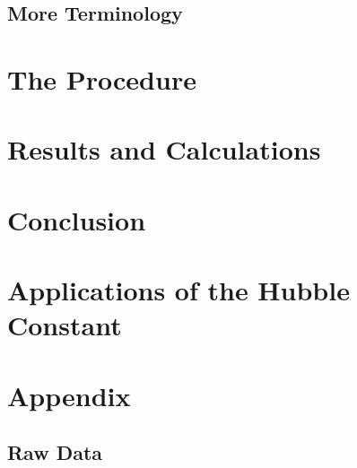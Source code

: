 \documentclass[12pt]{article}
\begin{document}
\subsection{More Terminology} \label{sec:1.5}

\section{The Procedure} 



\section{Results and Calculations}



\section{Conclusion}



\section{Applications of the Hubble Constant}




\newpage






\newpage

\section*{Appendix}

\subsection*{Raw Data}

\listoffigures
\end{document}
